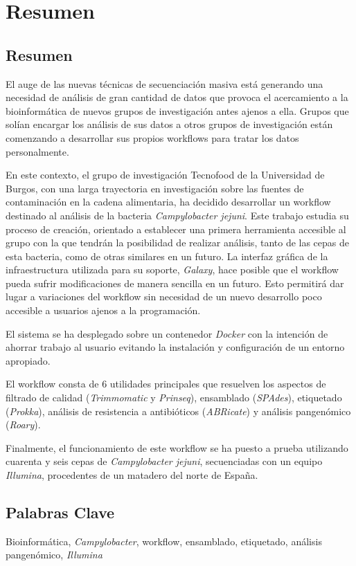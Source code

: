 \chapter*{Resumen}

\section*{Resumen}
El auge de las nuevas técnicas de secuenciación masiva está generando una necesidad de análisis de gran cantidad de datos que provoca el acercamiento a la bioinformática de nuevos grupos de investigación antes ajenos a ella. Grupos que solían encargar los análisis de sus datos a otros grupos de investigación están comenzando a desarrollar sus propios workflows para tratar los datos personalmente. 

En este contexto, el grupo de investigación Tecnofood de la Universidad de Burgos, con una larga trayectoria en investigación sobre las fuentes de contaminación en la cadena alimentaria, ha decidido desarrollar un workflow destinado al análisis de la bacteria \textit{Campylobacter jejuni}. Este trabajo estudia su proceso de creación, orientado a establecer una primera herramienta accesible al grupo con la que tendrán la posibilidad de realizar análisis, tanto de las cepas de esta bacteria, como de otras similares en un futuro. La interfaz gráfica de la infraestructura utilizada para su soporte, \textit{Galaxy}, hace posible que el workflow pueda sufrir modificaciones de manera sencilla en un futuro. Esto permitirá dar lugar a variaciones del workflow sin necesidad de un nuevo desarrollo poco accesible a usuarios ajenos a la programación.

El sistema se ha desplegado sobre un contenedor \textit{Docker} con la intención de ahorrar trabajo al usuario evitando la instalación y configuración de un entorno apropiado.

El workflow consta de 6 utilidades principales que resuelven los aspectos de filtrado de calidad (\textit{Trimmomatic} y \textit{Prinseq}), ensamblado (\textit{SPAdes}), etiquetado (\textit{Prokka}), análisis de resistencia a antibióticos (\textit{ABRicate}) y análisis pangenómico (\textit{Roary}). 

Finalmente, el funcionamiento de este workflow se ha puesto a prueba utilizando cuarenta y seis cepas de \textit{Campylobacter jejuni}, secuenciadas con un equipo \textit{Illumina}, procedentes de un matadero del norte de España.

\section*{Palabras Clave}
Bioinformática, \textit{Campylobacter}, workflow, ensamblado, etiquetado, análisis pangenómico, \textit{Illumina}


